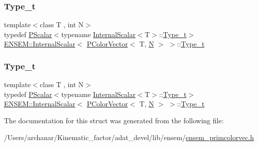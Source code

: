 \subsubsection{\texorpdfstring{Type\_t}{Type\_t}\hspace{0.1cm}{\footnotesize\ttfamily [1/2]}}
{\footnotesize\ttfamily template$<$class T , int N$>$ \\
typedef \mbox{\hyperlink{classENSEM_1_1PScalar}{P\+Scalar}}$<$typename \mbox{\hyperlink{structENSEM_1_1InternalScalar}{Internal\+Scalar}}$<$T$>$\+::\mbox{\hyperlink{structENSEM_1_1InternalScalar_3_01PColorVector_3_01T_00_01N_01_4_01_4_a24a574d9378f5b76122d29737f62fbfd}{Type\+\_\+t}}$>$ \mbox{\hyperlink{structENSEM_1_1InternalScalar}{E\+N\+S\+E\+M\+::\+Internal\+Scalar}}$<$ \mbox{\hyperlink{classENSEM_1_1PColorVector}{P\+Color\+Vector}}$<$ T, \mbox{\hyperlink{operator__name__util_8cc_a7722c8ecbb62d99aee7ce68b1752f337}{N}} $>$ $>$\+::\mbox{\hyperlink{structENSEM_1_1InternalScalar_3_01PColorVector_3_01T_00_01N_01_4_01_4_a24a574d9378f5b76122d29737f62fbfd}{Type\+\_\+t}}}

\mbox{\label{structENSEM_1_1InternalScalar_3_01PColorVector_3_01T_00_01N_01_4_01_4_a24a574d9378f5b76122d29737f62fbfd}} 
\subsubsection{\texorpdfstring{Type\_t}{Type\_t}\hspace{0.1cm}{\footnotesize\ttfamily [2/2]}}
{\footnotesize\ttfamily template$<$class T , int N$>$ \\
typedef \mbox{\hyperlink{classENSEM_1_1PScalar}{P\+Scalar}}$<$typename \mbox{\hyperlink{structENSEM_1_1InternalScalar}{Internal\+Scalar}}$<$T$>$\+::\mbox{\hyperlink{structENSEM_1_1InternalScalar_3_01PColorVector_3_01T_00_01N_01_4_01_4_a24a574d9378f5b76122d29737f62fbfd}{Type\+\_\+t}}$>$ \mbox{\hyperlink{structENSEM_1_1InternalScalar}{E\+N\+S\+E\+M\+::\+Internal\+Scalar}}$<$ \mbox{\hyperlink{classENSEM_1_1PColorVector}{P\+Color\+Vector}}$<$ T, \mbox{\hyperlink{operator__name__util_8cc_a7722c8ecbb62d99aee7ce68b1752f337}{N}} $>$ $>$\+::\mbox{\hyperlink{structENSEM_1_1InternalScalar_3_01PColorVector_3_01T_00_01N_01_4_01_4_a24a574d9378f5b76122d29737f62fbfd}{Type\+\_\+t}}}



The documentation for this struct was generated from the following file\+:\begin{DoxyCompactItemize}
\item 
/\+Users/archanar/\+Kinematic\+\_\+factor/adat\+\_\+devel/lib/ensem/\mbox{\hyperlink{lib_2ensem_2ensem__primcolorvec_8h}{ensem\+\_\+primcolorvec.\+h}}\end{DoxyCompactItemize}
